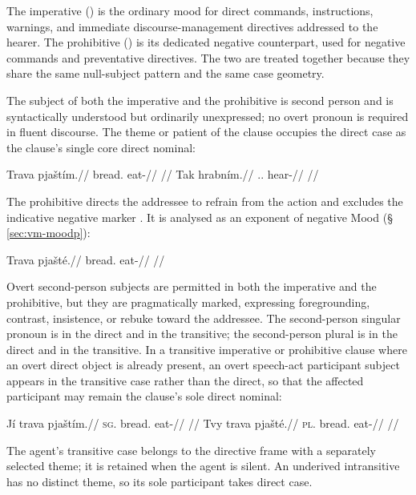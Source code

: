 The imperative () is the ordinary mood for direct commands,
instructions, warnings, and immediate discourse-management directives addressed
to the hearer. The prohibitive () is its dedicated negative counterpart,
used for negative commands and preventative directives. The two are treated
together because they share the same null-subject pattern and the same case
geometry.

The subject of both the imperative and the prohibitive is second person and is
syntactically understood but ordinarily unexpressed; no overt pronoun is
required in fluent discourse. The theme or patient of the clause occupies the
direct case as the clause's single core direct nominal:

\pex
\a
\begingl
\gla Trava pjaštím.//
\glb bread.\Dir{} eat-\Imp{}//
\glft {}//
\endgl
\a
\begingl
\gla Tak hrabním.//
\glb \Dem{}.\Prox{}.\Dir{} hear-\Imp{}//
\glft {}//
\endgl
\xe

The prohibitive directs the addressee to refrain from the action and excludes
the indicative negative marker . It is analysed as an exponent of
negative Mood (§\,\ref{sec:vm-moodp}):

\pex
\a
\begingl
\gla Trava pjašté.//
\glb bread.\Dir{} eat-\Proh{}//
\glft {}//
\endgl
\xe

Overt second-person subjects are permitted in both the imperative and the
prohibitive, but they are pragmatically marked, expressing foregrounding,
contrast, insistence, or rebuke toward the addressee. The second-person singular
pronoun is  in the direct and  in the transitive; the
second-person plural is  in the direct and  in the
transitive. In a transitive imperative or prohibitive clause where an overt
direct object is already present, an overt speech-act participant subject
appears in the transitive case rather than the direct, so that the affected
participant may remain the clause's sole direct nominal:

\pex
\a
\begingl
\gla Jí trava pjaštím.//
\textsc{sg}.\Trs{} bread.\Dir{} eat-\Imp{}//
\glft {} //
\endgl
\a
\begingl
\gla Tvy trava pjašté.//
\textsc{pl}.\Trs{} bread.\Dir{} eat-\Proh{}//
\glft {} //
\endgl
\xe

\noindent The agent's transitive case belongs to the directive frame with a
separately selected theme; it is retained when the agent is silent. An
underived intransitive has no distinct theme, so its sole participant takes
direct case.

